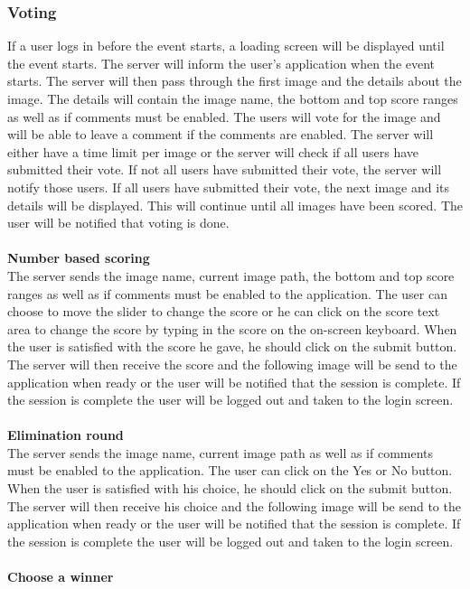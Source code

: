 \documentclass[10pt,a4paper]{article}
\begin{document}
\subsubsection{Voting}
If a user logs in before the event starts, a loading screen will be displayed until the event starts. The server will inform the user's application when the event starts. The server will then pass through the first image and the details about the image. The details will contain the image name, the bottom and top score ranges as well as if comments must be enabled. The users will vote for the image and will be able to leave a comment if the comments are enabled. The server will either have a time limit per image or the server will check if all users have submitted their vote. If not all users have submitted their vote, the server will notify those users. If all users have submitted their vote, the next image and its details will be displayed. This will continue until all images have been scored. The user will be notified that voting is done.
\\\\
\textbf{Number based scoring\\}
The server sends the image name, current image path, the bottom and top score ranges as well as if comments must be enabled  to the application. The user can choose to move the slider to change the score or he can click on the score text area to change the score by typing in the score on the on-screen keyboard. When the user is satisfied with the score he gave, he should click on the submit button. The server will then receive the score and the following image will be send to the application when ready or the user will be notified that the session is complete. If the session is complete the user will be logged out and taken to the login screen.
\\\\
\textbf{Elimination round\\}
The server sends the image name, current image path as well as if comments must be enabled to the application. The user can click on the Yes or No button. When the user is satisfied with his choice, he should click on the submit button. The server will then receive his choice and the following image will be send to the application when ready or the user will be notified that the session is complete. If the session is complete the user will be logged out and taken to the login screen.
\\\\
\textbf{Choose a winner\\}
\end{document}
